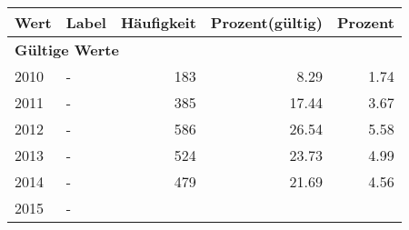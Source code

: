      \begin{longtable}{lXrrr}
     \toprule
     \textbf{Wert} & \textbf{Label} & \textbf{Häufigkeit} & \textbf{Prozent(gültig)} & \textbf{Prozent} \\
     \endhead
     \midrule
     \multicolumn{5}{l}{\textbf{Gültige Werte}}\\

     2010 &
     \multicolumn{1}{X}{ -  } &


       \num{183} &
       \num[round-mode=places,round-precision=2]{8.29} &
         \num[round-mode=places,round-precision=2]{1.74} \\

     2011 &
     \multicolumn{1}{X}{ -  } &


       \num{385} &
       \num[round-mode=places,round-precision=2]{17.44} &
         \num[round-mode=places,round-precision=2]{3.67} \\

     2012 &
     \multicolumn{1}{X}{ -  } &


       \num{586} &
       \num[round-mode=places,round-precision=2]{26.54} &
         \num[round-mode=places,round-precision=2]{5.58} \\

     2013 &
     \multicolumn{1}{X}{ -  } &


       \num{524} &
       \num[round-mode=places,round-precision=2]{23.73} &
         \num[round-mode=places,round-precision=2]{4.99} \\

     2014 &
     \multicolumn{1}{X}{ -  } &


       \num{479} &
       \num[round-mode=places,round-precision=2]{21.69} &
         \num[round-mode=places,round-precision=2]{4.56} \\

     2015 &
     \multicolumn{1}{X}{ -  } &



\end{longtable}
